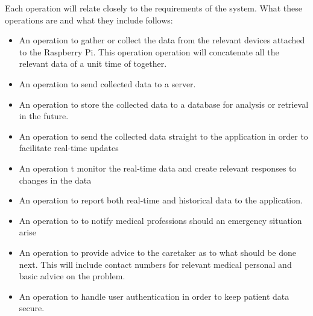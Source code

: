   Each operation will relate closely to the requirements of the system. What these operations are and what they include follows:
			\begin{itemize}
				           
            
            \item{An operation to gather or collect the data from the relevant 
            devices attached to the Raspberry Pi. This operation operation will concatenate all the relevant data of a unit time of together.}
            \item{An operation to send collected data to a server.}
            
            \item{An operation to store the collected data to a database for analysis or retrieval in the future.}
            
            \item{An operation to send the collected data straight to the application in order to facilitate real-time updates}
            
            \item{An operation t monitor the real-time data and create relevant responses to changes in the data}
            
            \item{An operation to report both real-time and historical data to the application.}
            
            \item{An operation to to notify medical professions should an emergency situation arise}
            
            \item{An operation to provide advice to the caretaker as to what should be done next. This will include contact numbers for relevant medical personal and basic advice on the problem.}
            
            \item{An operation to handle user authentication in order to keep patient data secure.}
            
\end{itemize}		